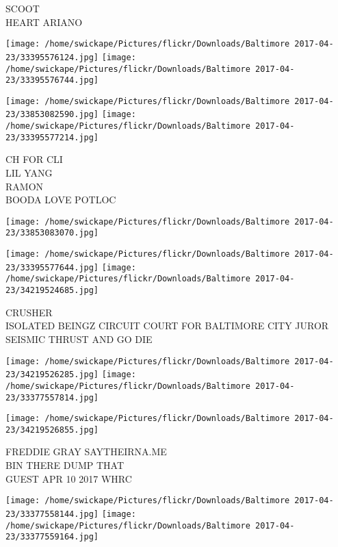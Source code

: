 \documentclass[10pt,letterpaper]{article}
\begin{document}
SCOOT\\
HEART ARIANO\\
\pagebreak

\texttt{[image: /home/swickape/Pictures/flickr/Downloads/Baltimore 2017-04-23/33395576124.jpg]}
\texttt{[image: /home/swickape/Pictures/flickr/Downloads/Baltimore 2017-04-23/33395576744.jpg]}

\texttt{[image: /home/swickape/Pictures/flickr/Downloads/Baltimore 2017-04-23/33853082590.jpg]}
\texttt{[image: /home/swickape/Pictures/flickr/Downloads/Baltimore 2017-04-23/33395577214.jpg]}

CH FOR CLI\\
LIL YANG\\
RAMON\\
BOODA LOVE POTLOC\\
\pagebreak

\texttt{[image: /home/swickape/Pictures/flickr/Downloads/Baltimore 2017-04-23/33853083070.jpg]}

\vspace{0.25in}
\texttt{[image: /home/swickape/Pictures/flickr/Downloads/Baltimore 2017-04-23/33395577644.jpg]}
\texttt{[image: /home/swickape/Pictures/flickr/Downloads/Baltimore 2017-04-23/34219524685.jpg]}

CRUSHER\\
ISOLATED BEINGZ CIRCUIT COURT FOR BALTIMORE CITY JUROR\\
SEISMIC THRUST AND GO DIE\\
\pagebreak

\texttt{[image: /home/swickape/Pictures/flickr/Downloads/Baltimore 2017-04-23/34219526285.jpg]}
\texttt{[image: /home/swickape/Pictures/flickr/Downloads/Baltimore 2017-04-23/33377557814.jpg]}

\vspace{0.25in}
\texttt{[image: /home/swickape/Pictures/flickr/Downloads/Baltimore 2017-04-23/34219526855.jpg]}

FREDDIE GRAY SAYTHEIRNA.ME\\
BIN THERE DUMP THAT\\
GUEST APR 10 2017 WHRC\\
\pagebreak

\texttt{[image: /home/swickape/Pictures/flickr/Downloads/Baltimore 2017-04-23/33377558144.jpg]}
\texttt{[image: /home/swickape/Pictures/flickr/Downloads/Baltimore 2017-04-23/33377559164.jpg]}
\end{document}
